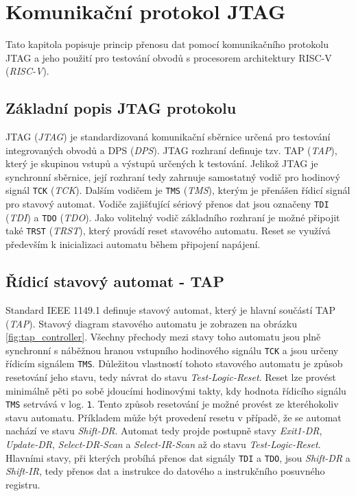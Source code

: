 \chapter{Komunikační protokol JTAG}
Tato kapitola popisuje princip přenosu dat pomocí komunikačního protokolu JTAG a jeho použití pro testování obvodů s procesorem architektury \acs{RISC-V} (\textit{\acl{RISC-V}}).

\section{Základní popis \acs{JTAG} protokolu}
\acs{JTAG} (\textit{\acl{JTAG}}) je standardizovaná komunikační sběrnice určená pro testování integrovaných obvodů a \acs{DPS} (\textit{\acl{DPS}}).
\acs{JTAG} rozhraní definuje tzv. \acs{TAP} (\textit{\acl{TAP}}), který je skupinou vstupů a výstupů určených k testování. Jelikož \acs{JTAG} je synchronní sběrnice, její rozhraní tedy zahrnuje samostatný vodič pro hodinový signál \texttt{\acs{TCK}} (\textit{\acl{TCK}}). Dalším vodičem je \texttt{\acs{TMS}} (\textit{\acl{TMS}}), kterým je přenášen řídicí signál pro stavový automat. Vodiče zajišťující sériový přenos dat jsou označeny \texttt{\acs{TDI}} (\textit{\acl{TDI}}) a \texttt{\acs{TDO}} (\textit{\acl{TDO}}). Jako volitelný vodič základního rozhraní je možné připojit také \texttt{\acs{TRST}} (\textit{\acl{TRST}}), který provádí reset stavového automatu. Reset se využívá především k inicializaci automatu během připojení napájení. \cite {IEEE_1149-1} \cite{JTAG}

\section{Řídicí stavový automat - \acs{TAP}}
Standard IEEE 1149.1 definuje stavový automat, který je hlavní součástí \acs{TAP} (\textit{\acl{TAP}}). Stavový diagram stavového automatu je zobrazen na obrázku \ref{fig:tap_controller}. Všechny přechody mezi stavy toho automatu jsou plně synchronní s náběžnou hranou vstupního hodinového signálu \texttt{\acs{TCK}} a jsou určeny řídicím signálem \texttt{\acs{TMS}}. Důležitou vlastností tohoto stavového automatu je způsob resetování jeho stavu, tedy návrat do stavu \textit{Test-Logic-Reset}. Reset lze provést minimálně pěti po sobě jdoucími hodinovými takty, kdy hodnota řídicího signálu \texttt{\acs{TMS}} setrvává v log. \texttt{1}. Tento způsob resetování je možné provést ze kteréhokoliv stavu automatu. Příkladem může být provedení resetu v případě, že se automat nachází ve stavu \textit{Shift-DR}. Automat tedy projde postupně stavy \textit{Exit1-DR}, \textit{Update-DR}, \textit{Select-DR-Scan} a \textit{Select-IR-Scan} až do stavu \textit{Test-Logic-Reset}. Hlavními stavy, při kterých probíhá přenos dat signály \texttt{\acs{TDI}} a \texttt{\acs{TDO}}, jsou \textit{Shift-DR} a \textit{Shift-IR}, tedy přenos dat a instrukce do datového a instrukčního posuvného registru. \cite {IEEE_1149-1}

